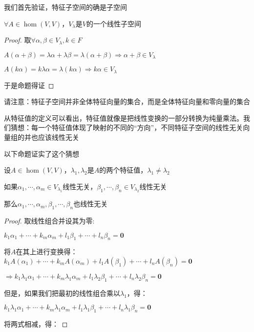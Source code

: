 \documentclass[12pt, a4paper, oneside, UTF8]{ctexbook}
\begin{document}
			\begin{para}{0}
				\point{}

					我们首先验证，特征子空间的确是子空间
					\begin{proposition}
						$\forall A \in \hom(V,V)$，$V_\lambda $是$V$的一个线性子空间
					\end{proposition}
					\begin{proof}
						取$\forall \alpha ,\beta \in V_\lambda ,k \in F$

						$A(\alpha +\beta )=\lambda \alpha +\lambda \beta =\lambda (\alpha +\beta ) \Rightarrow \alpha +\beta \in V_\lambda $

						$A(k\alpha )=k\lambda \alpha =\lambda (k\alpha )\Rightarrow k\alpha \in V_\lambda $

						于是命题得证
					\end{proof}
					请注意：特征子空间并非全体特征向量的集合，而是全体特征向量和零向量的集合
				\point{}
					
					从特征值的定义可以看出，特征值就像是把线性变换的一部分转换为纯量乘法。我们猜想：每一个特征值体现了映射的不同的“方向”，不同特征子空间的线性无关向量组的并也应该线性无关

					以下命题证实了这个猜想
					\begin{proposition}
						设$A \in \hom(V,V)$，$\lambda_1,\lambda_2$是$A$的两个特征值，$\lambda_1\neq \lambda_2$

						如果$\alpha_1,\cdots,\alpha_m \in V_{\lambda_1}$线性无关，$\beta_1,\cdots,\beta_n \in V_{\lambda_2}$线性无关

						那么$\alpha_1,\cdots,\alpha_m,\beta_1,\cdots,\beta_n$也线性无关
					\end{proposition}
					\begin{proof}
						取线性组合并设其为零:

						$k_1\alpha_1+\cdots+k_m\alpha_m+l_1\beta_1+\cdots+l_n\beta_n=\mathbf{0}$

						将$A$在其上进行变换得：$k_1A(\alpha_1)+\cdots+k_mA(\alpha_m)+l_1A(\beta_1)+\cdots+l_nA(\beta_n)=\mathbf{0}$

						$\Rightarrow k_1\lambda_1\alpha_1 +\cdots+k_m\lambda_1\alpha_m+l_1\lambda_2\beta_1+\cdots+l_n\lambda_2\beta_n=\mathbf{0}$

						但是，如果我们把最初的线性组合乘以$\lambda_1$，得：

						$k_1\lambda_1\alpha_1 +\cdots+k_m\lambda_1\alpha_m+l_1\lambda_1\beta_1+\cdots+l_n\lambda_1\beta_n=\mathbf{0}$

						将两式相减，得：


\end{proof}
\end{para}
\end{document}
